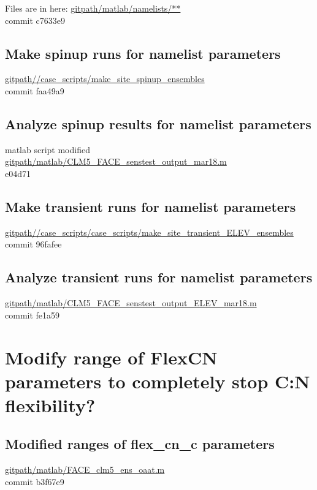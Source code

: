 \documentclass{article}
\begin{document}
Files are in here:
{\color{magenta}\small{\url{gitpath/matlab/namelists/**}}}\\
commit c7633e9 

\subsection{Make spinup runs for namelist parameters}
{\color{blue}\small{\url{gitpath//case_scripts/make_site_spinup_ensembles}}}\\
commit faa49a9

 
\subsection{Analyze spinup results for namelist parameters} 
matlab script modified
{\color{blue}\small{\url{gitpath/matlab/CLM5_FACE_senstest_output_mar18.m
}}}\\
e04d71

\subsection{Make transient runs for namelist parameters}

{\color{blue}\small{\url{gitpath//case_scripts/case_scripts/make_site_transient_ELEV_ensembles}}}\\
commit 96fafee

\subsection{Analyze transient runs for namelist parameters}


{\color{blue}\small{\url{gitpath/matlab/CLM5_FACE_senstest_output_ELEV_mar18.m}}}\\
commit fe1a59



\section{Modify range of FlexCN parameters to completely stop C:N flexibility?}

\subsection{Modified ranges of flex\_cn\_c parameters}

{\color{blue}\small{\url{gitpath/matlab/FACE_clm5_ens_oaat.m 
}}}\\
commit b3f67e9  
\end{document}
